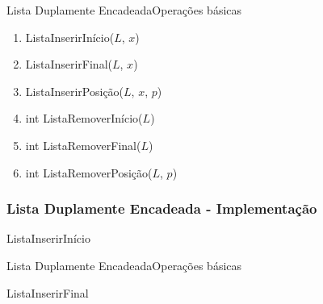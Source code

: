 \documentclass[aspectratio=169]{beamer}
\begin{document}

\begin{frame}{Lista Duplamente Encadeada}{Operações básicas}
\begin{enumerate}
 \item ListaInserirInício($L$, $x$)
 \item ListaInserirFinal($L$, $x$)
 \item ListaInserirPosição($L$, $x$, $p$)
 \item int ListaRemoverInício($L$) 
 \item int ListaRemoverFinal($L$) 
 \item int ListaRemoverPosição($L$, $p$) 
\end{enumerate}
\end{frame}



\begin{frame}
\frametitle{Lista Duplamente Encadeada - Implementação}
\begin{algorithm}[H]
\caption{ListaInserirInício} 
\label{ListaDuplaInserirInicio}
\end{algorithm}
\end{frame}



\begin{frame}{Lista Duplamente Encadeada}{Operações básicas}
\begin{algorithm}[H]
\caption{ListaInserirFinal} 
\label{ListaDuplaInserirFinal}
\end{algorithm}
\end{frame}
\end{document}
